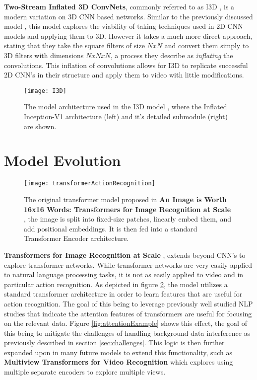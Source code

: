 \textbf{Two-Stream Inflated 3D ConvNets}, commonly referred to as I3D \cite{i3d}, is a modern variation on 3D CNN based networks. Similar to the previously discussed model \cite{3DCNN-ActionRecognition}, this model explores the viability of taking techniques used in 2D CNN models and applying them to 3D. However it takes a much more direct approach, stating that they take the square filters of size $NxN$ and convert them simply to 3D filters with dimensions $NxNxN$, a process they describe as \textit{inflating} the convolutions. This inflation of convolutions allows for I3D to replicate successful 2D CNN's in their structure and apply them to video with little modifications.

\begin{figure}[ht]
	\texttt{[image: I3D]}
	\centering
	\caption{The model architecture used in the I3D model \cite{i3d}, where the Inflated Inception-V1 architecture (left) and it's detailed submodule (right) are shown.}
	\label{fig:I3D}
\end{figure}

\section{Model Evolution}

\begin{figure}[ht]
	\texttt{[image: transformerActionRecognition]}
	\centering
	\caption{The original transformer model proposed in \textbf{An Image is Worth 16x16 Words: Transformers for Image Recognition at Scale} \cite{transformer_og}, the image is split into fixed-size patches, linearly embed them, and add positional embeddings. It is then fed into a standard Transformer Encoder architecture.}
	\label{fig:transformerActionRecognition}
\end{figure}

\textbf{Transformers for Image Recognition at Scale} \cite{transformer_og}, extends beyond CNN's to explore transformer networks. While transformer networks are very easily applied to natural language processing tasks, it is not as easily applied to video and in particular action recognition. As depicted in figure \ref{fig:transformerActionRecognition}, the model utilizes a standard transformer architecture in order to learn features that are useful for action recognition. The goal of this being to leverage previously well studied NLP studies that indicate the attention features of transformers are useful for focusing on the relevant data. Figure \ref{fig:attentionExample} shows this effect, the goal of this being to mitigate the challenges of handling background data interference as previously described in section \ref{sec:challenges}. This logic is then further expanded upon in many future models to extend this functionality, such as \textbf{Multiview Transformers for Video Recognition} \cite{multiview_transformers} which explores using multiple separate encoders to explore multiple views.

